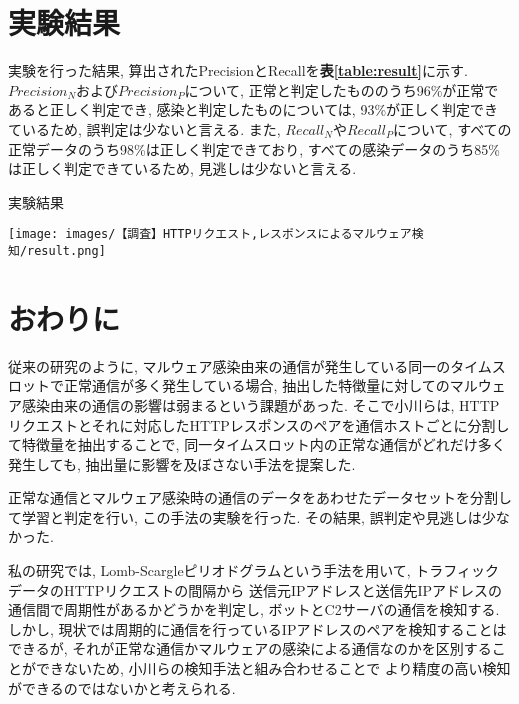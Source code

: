 \documentclass[twocolumn,10pt]{ltjsarticle}
\begin{document}
\section{実験結果}
実験を行った結果, 算出されたPrecisionとRecallを\textbf{表\ref{table:result}}に示す. 
$Precision_N$および$Precision_P$について, 正常と判定したもののうち96\%が正常であると正しく判定でき, 
感染と判定したものについては, 93\%が正しく判定できているため, 誤判定は少ないと言える. 
また, $Recall_N$や$Recall_P$について, すべての正常データのうち98\%は正しく判定できており, 
すべての感染データのうち85\%は正しく判定できているため, 見逃しは少ないと言える. 

\begin{table}[htb]
    \caption{実験結果}
    \label{table:result}
    \centering
    \texttt{[image: images/【調査】HTTPリクエスト,レスポンスによるマルウェア検知/result.png]}
\end{table}

\section{おわりに}
従来の研究のように, マルウェア感染由来の通信が発生している同一のタイムスロットで正常通信が多く発生している場合, 
抽出した特徴量に対してのマルウェア感染由来の通信の影響は弱まるという課題があった. 
そこで小川らは, HTTPリクエストとそれに対応したHTTPレスポンスのペアを通信ホストごとに分割して特徴量を抽出することで, 
同一タイムスロット内の正常な通信がどれだけ多く発生しても, 抽出量に影響を及ぼさない手法を提案した. \par
正常な通信とマルウェア感染時の通信のデータをあわせたデータセットを分割して学習と判定を行い, この手法の実験を行った. 
その結果, 誤判定や見逃しは少なかった. \par
私の研究では, Lomb-Scargleピリオドグラムという手法を用いて, トラフィックデータのHTTPリクエストの間隔から
送信元IPアドレスと送信先IPアドレスの通信間で周期性があるかどうかを判定し, ボットとC2サーバの通信を検知する. 
しかし, 現状では周期的に通信を行っているIPアドレスのペアを検知することはできるが, 
それが正常な通信かマルウェアの感染による通信なのかを区別することができないため, 小川らの検知手法と組み合わせることで
より精度の高い検知ができるのではないかと考えられる. 




\end{document}
